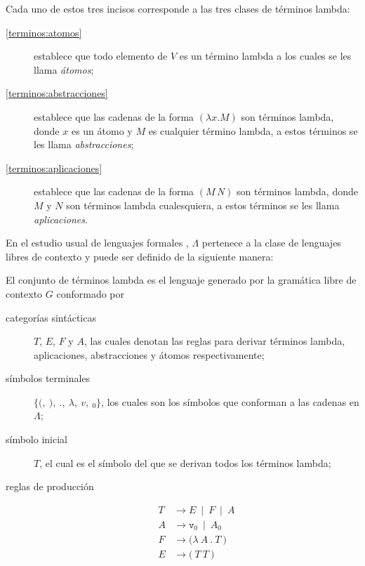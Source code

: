 Cada uno de estos tres incisos corresponde a las tres clases de términos lambda:

\begin{description}
\item[\eqref{terminos:atomos}] establece que todo elemento de \( V \) es un término lambda a los cuales se les llama \emph{átomos};
\item[\eqref{terminos:abstracciones}] establece que las cadenas de la forma \( (λx.M) \) son términos lambda, donde \( x \) es un átomo y \( M \) es cualquier término lambda, a estos términos se les llama \emph{abstracciones};
\item[\eqref{terminos:aplicaciones}] establece que las cadenas de la forma \( (M\, N) \) son términos lambda, donde \( M \) y \( N \) son términos lambda cualesquiera, a estos términos se les llama \emph{aplicaciones}.
\end{description}

En el estudio usual de lenguajes formales \cite{Hopcroft:Automata}, \( Λ \) pertenece a la clase de lenguajes libres de contexto y puede ser definido de la siguiente manera:

\begin{defn}
  \label{defn:terminos-cfg}
  El conjunto de términos lambda es el lenguaje generado por la gramática libre de contexto \( G \) conformado por

  \begin{description}
  \item[categorías sintácticas] \( T \), \( E \), \( F \) y \( A \), las cuales denotan las reglas para derivar términos lambda, aplicaciones, abstracciones y átomos respectivamente;
  \item[símbolos terminales] \( \{\mathtt{(},\ \mathtt{)},\ \mathtt{.},\ λ,\ v,\ {}_{0}\} \), los cuales son los símbolos que conforman a las cadenas en \( Λ \);
  \item[símbolo inicial] \( T \), el cual es el símbolo del que se derivan todos los términos lambda;
  \item[reglas de producción]
    \begin{subequations}
    \begin{align}
      \label{terminos-cfg:terminos} \tag{a}
      T & \rightarrow E\ \mid\ F\ \mid\ A \\
      \label{terminos-cfg:atomos} \tag{b}
      A & \rightarrow \mathtt{v}_{0}\ \mid\ A {}_{0} \\
      \label{terminos-cfg:abstracciones} \tag{c}
      F & \rightarrow \mathtt{(} λ\ A\ \mathtt{.}\ T\ \mathtt{)} \\
      \label{terminos-cfg:aplicaciones} \tag{d}
      E & \rightarrow \mathtt{(}\ T\ T\ \mathtt{)}
    \end{align}
  \end{subequations}
  \end{description}
\end{defn}

